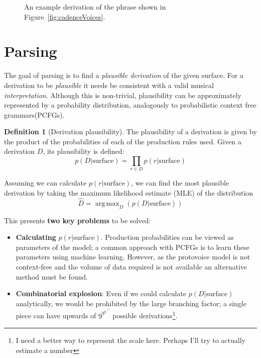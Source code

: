 \documentclass[12pt,a4paper,twoside,openright]{report}
\DeclareMathOperator*{\argmax}{arg\,max}
\theoremstyle{definition}
\newtheorem{definition}{Definition}[section]
\begin{document}
\begin{figure}
  \captionsetup{width=.9\linewidth}
  \caption{An example derivation of the phrase shown in Figure~\ref{fig:cadenceVoices}. }
  \label{fig:innerOuterStructure}
\end{figure}

\FloatBarrier
\section{Parsing} %
\label{sub:protovoiceParsing}

The goal of parsing is to find a \textit{plausible derivation} of the given surface. For a derivation to be \textit{plausible} it needs be consistent with a valid musical \textit{interpretation}. Although this is non-trivial, plausibility can be approximately represented by a probability distribution, analogously to probabilistic context free grammars(PCFGs).
\par
\begin{definition}[Derivation plausibility]
  The plausibility of a derivation is given by the product of the probabilities of each of the production rules used. Given a derivation $D$, its plausibility is defined:
  \begin{equation}
    p(D|\text{surface}) = \prod_{r \in D}  p(r|\text{surface})
  \end{equation}
\end{definition}

Assuming we can calculate $p(r|\text{surface})$, we can find the most plausible derivation by taking the maximum likelihood estimate (MLE) of the distribution
\begin{equation}
  \hat D = \argmax_{D} \left( p(D|\text{surface})\right)
  \label{eq:mapApproach}
\end{equation}

This presents \textbf{two key problems} to be solved:

\begin{itemize}
  \item \textbf{Calculating} $p(r|\text{surface})$. Production probabilities can be viewed as parameters of the model; a common approach with PCFGs is to learn these parameters using machine learning. However, as the protovoice model is not context-free and the volume of data required is not available an alternative method must be found.
  \item \textbf{Combinatorial explosion}: Even if we could calculate $p(D|\text{surface})$ analytically, we would be prohibited by the large branching factor; a single piece can have upwards of $9^{9^{9^{{\iddots}^{9^{9}}}}}$ possible derivations\footnote{I need a better way to represent the scale here. Perhaps I'll try to actually estimate a number}.
\end{itemize}
\end{document}
